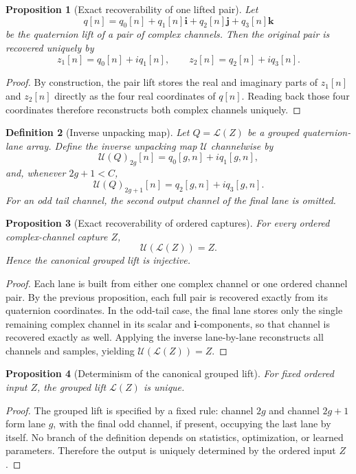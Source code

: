 \documentclass[11pt]{article}
\newtheorem{definition}{Definition}[section]
\newtheorem{proposition}[definition]{Proposition}
\theoremstyle{remark}
\newcommand{\ii}{\mathbf{i}}
\newcommand{\jj}{\mathbf{j}}
\newcommand{\kk}{\mathbf{k}}
\newcommand{\lift}{\mathcal{L}}
\newcommand{\unpack}{\mathcal{U}}
\begin{document}
\begin{proposition}[Exact recoverability of one lifted pair]
Let
\[
q[n]=q_0[n]+q_1[n]\ii+q_2[n]\jj+q_3[n]\kk
\]
be the quaternion lift of a pair of complex channels. Then the original pair is recovered uniquely by
\[
z_1[n]=q_0[n]+iq_1[n],
\qquad
z_2[n]=q_2[n]+iq_3[n].
\]
\end{proposition}

\begin{proof}
By construction, the pair lift stores the real and imaginary parts of \(z_1[n]\) and \(z_2[n]\) directly as the four real coordinates of \(q[n]\). Reading back those four coordinates therefore reconstructs both complex channels uniquely.
\end{proof}

\begin{definition}[Inverse unpacking map]
Let \(Q=\lift(Z)\) be a grouped quaternion-lane array. Define the inverse unpacking map \(\unpack\) channelwise by
\[
\unpack(Q)_{2g}[n]=q_0[g,n]+iq_1[g,n],
\]
and, whenever \(2g+1<C\),
\[
\unpack(Q)_{2g+1}[n]=q_2[g,n]+iq_3[g,n].
\]
For an odd tail channel, the second output channel of the final lane is omitted.
\end{definition}

\begin{proposition}[Exact recoverability of ordered captures]
For every ordered complex-channel capture \(Z\),
\[
\unpack(\lift(Z))=Z.
\]
Hence the canonical grouped lift is injective.
\end{proposition}

\begin{proof}
Each lane is built from either one complex channel or one ordered channel pair. By the previous proposition, each full pair is recovered exactly from its quaternion coordinates. In the odd-tail case, the final lane stores only the single remaining complex channel in its scalar and \(\ii\)-components, so that channel is recovered exactly as well. Applying the inverse lane-by-lane reconstructs all channels and samples, yielding \(\unpack(\lift(Z))=Z\).
\end{proof}

\begin{proposition}[Determinism of the canonical grouped lift]
For fixed ordered input \(Z\), the grouped lift \(\lift(Z)\) is unique.
\end{proposition}

\begin{proof}
The grouped lift is specified by a fixed rule: channel \(2g\) and channel \(2g+1\) form lane \(g\), with the final odd channel, if present, occupying the last lane by itself. No branch of the definition depends on statistics, optimization, or learned parameters. Therefore the output is uniquely determined by the ordered input \(Z\).
\end{proof}
\end{document}

